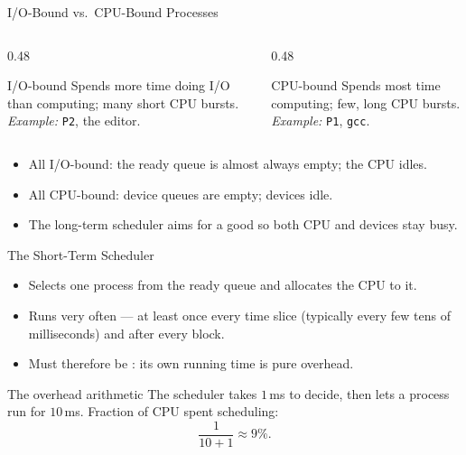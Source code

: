 \documentclass[aspectratio=169]{beamer}
\begin{document}
\begin{frame}{I/O-Bound vs.\ CPU-Bound Processes}
  \begin{columns}[T]
    \begin{column}{0.48\textwidth}
      \begin{block}{I/O-bound}
        Spends more time doing I/O than computing; many short CPU bursts.
        \emph{Example:} \texttt{P2}, the editor.
      \end{block}
    \end{column}
    \begin{column}{0.48\textwidth}
      \begin{block}{CPU-bound}
        Spends most time computing; few, long CPU bursts.
        \emph{Example:} \texttt{P1}, \texttt{gcc}.
      \end{block}
    \end{column}
  \end{columns}
  \vspace{0.3cm}
  \begin{itemize}
    \item All I/O-bound: the ready queue is almost always empty; the CPU idles.
    \item All CPU-bound: device queues are empty; devices idle.
    \item The long-term scheduler aims for a good  so both
      CPU and devices stay busy.
  \end{itemize}
\end{frame}

\begin{frame}{The Short-Term Scheduler}
  \begin{itemize}
    \item Selects one process from the ready queue and allocates the CPU to
      it.
    \item Runs very often --- at least once every time slice (typically every
      few tens of milliseconds) and after every block.
    \item Must therefore be : its own running time is pure
      overhead.
  \end{itemize}
  \vspace{0.2cm}
  \begin{exampleblock}{The overhead arithmetic}
    The scheduler takes $1$\,ms to decide, then lets a process run for
    $10$\,ms. Fraction of CPU spent scheduling:
    \[
      \frac{1}{10 + 1} \approx 9\%.
    \]
  \end{exampleblock}
\end{frame}
\end{document}
